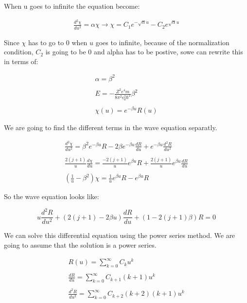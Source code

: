 When u goes to infinite the equation become:

\begin{equation}
  \begin{array}{c}
    \frac{d^2\chi}{du^2} = \alpha\chi \rightarrow \chi = C_1 e^{-\sqrt{\alpha}u} - C_2 e^{\sqrt{\alpha}u}
  \end{array}
\end{equation}

Since $\chi$ has to go to 0 when $u$ goes to infinite, because of the normalization condition, $C_2$ is going to be 0 and alpha has to be postive, sowe can rewrite this in terms of:

\begin{equation}
  \begin{array}{c}
    \alpha=\beta^2
    \\

    \\
    E = -\frac{Z^2e^4m}{8\pi^2\epsilon_0^2\hbar^2}\beta^2
    \\

    \\
    \chi(u) = e^{-\beta u}R(u)
  \end{array}
\end{equation}

We are going to find the different terms in the wave equation separatly.

\begin{equation}
  \begin{array}{c}
    \frac{d^2\chi}{du^2} = \beta^2 e^{-\beta u} R - 2\beta e^{-\beta u} \frac{dR}{du}+e^{-\beta u} \frac{d^2R}{du^2}
    \\

    \\
    \frac{2(j+1)}{u} \frac{d\chi}{du} = \frac{-2(j+1)}{u} e^{\beta u} R + \frac{2(j+1)}{u} e^{\beta u} \frac{dR}{du}
    \\

    \\
    \left(\frac{1}{u}-\beta^2\right)\chi = \frac{1}{u} e^{\beta u}R -e^{\beta u} R
  \end{array}
\end{equation}

So the wave equation looks like:

\begin{equation}
  u\frac{d^2R}{du^2}+(2(j+1)-2\beta u)\frac{dR}{du} + (1 - 2(j+1)\beta)R = 0
\end{equation}

We can solve this differential equation using the power series method. We are going to assume that the solution is a power series.

\begin{equation}
  \begin{array}{c}
    R(u) = \sum_{k=0}^{\infty} C_k u^k
    \\

    \\
    \frac{dR}{du} = \sum_{k=0}^{\infty} C_{k+1} (k+1) u^{k}
    \\

    \\
    \frac{d^2R}{du^2} = \sum_{k=0}^{\infty} C_{k+2} (k+2)(k+1) u^{k}
  \end{array}
\end{equation}
